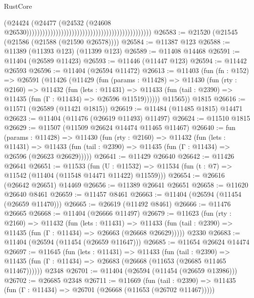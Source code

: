 \begin{lexlean}{RustCore}
\begin{coremodule}
                                                                                          (@24424
                                                                                            (@24477
                                                                                              (@24532
                                                                                                (@24608
                                                                                                  @26530)))))))))))))))))))))))))))))))))))))))))))))))
@26583 := @21520 (@21545 (@21586 (@21588 (@21590 @26578))))
@26584 := @11387 @123
@26588 := @11389 (@11393 @123) (@11399 @123)
@26589 := @11408 @14468
@26591 := @11404 (@26589 @11423)
@26593 := @11446 (@11447 @123)
@26594 := @11442 @26593
@26596 := @11404 (@26594 @11472)
@26613 := @11403
    (fun (fn : @152) =>
    @26591
      (@11426
        (@11429
          (fun (params : @11428) =>
          @11430
            (fun (rty : @2160) =>
            @11432
              (fun (lets : @11431) =>
              @11433 (fun (tail : @2390) => @11435 (fun (Γ : @11434) => @26596 @11519))))))
        @11565))
    @1815
@26616 := @11571 (@26589 (@11421 @1815))
@26619 := @11484 (@11485 @1815) @14471
@26623 := @11404 (@11476 (@26619 @11493) @11497)
@26624 := @11510 @1815
@26629 := @11507 (@11509 @26624 @14474 @11465 @11467)
@26640 := fun (params : @11428) =>
  @11430
    (fun (rty : @2160) =>
    @11432
      (fun (lets : @11431) =>
      @11433 (fun (tail : @2390) => @11435 (fun (Γ : @11434) => @26596 (@26623 @26629)))))
@26641 := @11429 @26640
@26642 := @11426 @26641
@26651 := @11533
    (fun (U : @11532) => @11534 (fun (t : @7) => @11542 (@11404 (@11548 @14471 @11422) @11559)))
@26654 := @26616 (@26642 @26651) @14469
@26656 := @11389 @26641 @26651
@26658 := @11620 @26640 @8461
@26659 := @11457 @8461
@26663 := @11404 (@26594 (@11454 (@26659 @11470)))
@26665 := @26619 (@11492 @8461)
@26666 := @11476 @26665
@26668 := @11404 (@26666 @11497)
@26679 := @11623
    (fun (rty : @2160) =>
    @11432
      (fun (lets : @11431) =>
      @11433 (fun (tail : @2390) => @11435 (fun (Γ : @11434) => @26663 (@26668 @26629)))))
    @2330
@26683 := @11404 (@26594 (@11454 (@26659 @11647)))
@26685 := @11654 @26624 @14474
@26697 := @11645
    (fun (lets : @11431) =>
    @11433
      (fun (tail : @2390) =>
      @11435 (fun (Γ : @11434) => @26683 (@26668 (@11653 (@26685 @11465 @11467))))))
    @2348
@26701 := @11404 (@26594 (@11454 (@26659 @13986)))
@26702 := @26685 @2348
@26711 := @11669
    (fun (tail : @2390) => @11435 (fun (Γ : @11434) => @26701 (@26668 (@11653 (@26702 @11467)))))

\end{coremodule}
\end{lexlean}
